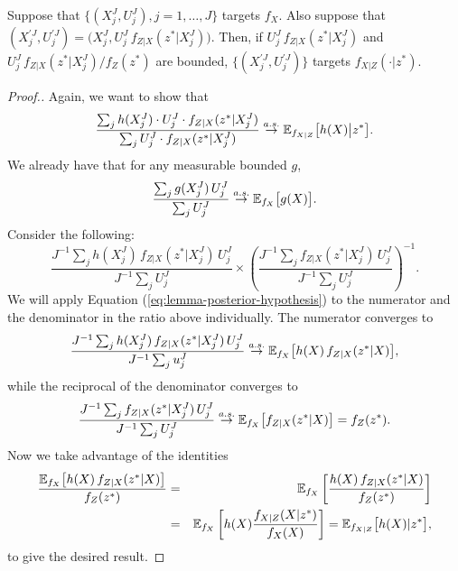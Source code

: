 \begin{lem}
    \label{lem:posterior-proper-weights}
    Suppose that $\{(X_j^J,U_j^J),j=1,\dots,J\}$ targets $f_X$.
    Also suppose that $(X^{\prime J}_j,U^{\prime J}_j) = \big(X_j^J,U_j^J \, f_{Z|X}(z^*|X_j^J)\big)$. 
    Then, if $U_j^J \, f_{Z|X}(z^*|X_j^J)$ and $U_j^J \, f_{Z|X}(z^*|X_j^J) \big/ f_Z(z^*)$ are bounded, $\{(X^{\prime J}_j,U^{\prime J}_j)\}$ targets $f_{X|Z}(\cdot | z^*)$.
\end{lem}

\begin{proof}[Proof.]
    Again, we want to show that
     \begin{equation}
     \frac{\sum_j h(X_j^J) \cdot U_j^J \cdot f_{Z|X}(z^*|X_j^J)}{\sum_j U_j^J \cdot f_{Z|X}(z^*|X_j^J)} \stackrel{a.s.}{\to} \mathbb{E}_{f_{X|Z}}\big[h(X)\big|z^*\big].
     \end{equation}
    We already have that for any measurable bounded $g$,
    \begin{equation}
        \frac{\sum_j g(X_j^J)\, U_j^J}{\sum_j U_j^J} \stackrel{a.s.}{\to} \mathbb{E}_{f_X}\big[g(X)\big].
        \label{eq:lemma-posterior-hypothesis}
    \end{equation}
    Consider the following:
    \begin{equation}
    \frac{J^{-1} \sum_j h(X_j^J) \, f_{Z|X}(z^*|X_j^J)\,  {U}_j^{J}}{J^{-1} \sum_j {U}_j^{J}}
    \times \left( \frac{J^{-1} \sum_j f_{Z|X}(z^*|X_j^J) \, {U}_j^{J}}{J^{-1} \sum_j {U}_j^{J}} \right)^{-1}.
    \end{equation}
    We will apply Equation (\ref{eq:lemma-posterior-hypothesis}) to the numerator and the denominator in the ratio above individually. The numerator converges to 
    \begin{equation}
    \frac{J^{-1} \sum_j h(X_j^J) \, f_{Z|X}(z^*|X_j^J) \, {U}_j^{J}}{J^{-1} \sum_j {u}_j^{J}} \stackrel{a.s.}{\to} \mathbb{E}_{f_X}\big[h(X)\, f_{Z|X}(z^*|X)\big],
    \end{equation}
    while the reciprocal of the denominator converges to 
    \begin{equation} 
    \frac{J^{-1} \sum_j f_{Z|X}(z^*|X_j^J) \, {U}_j^{J}}{J^{-1} \sum_j {U}_j^{J}}  \stackrel{a.s.}{\to} \mathbb{E}_{f_X}\big[f_{Z|X}(z^*|X)\big] = f_Z(z^*).
    \end{equation}
    Now we take advantage of the identities
    \begin{eqnarray}
    \frac{\mathbb{E}_{f_X}\big[h(X)\, f_{Z|X}(z^*|X)\big]}{f_Z(z^*)} &=& \mathbb{E}_{f_X}\left[\frac{h(X)\, f_{Z|X}(z^*|X)}{f_Z(z^*)}\right] 
    \\
    &=& \mathbb{E}_{f_X}\left[h(X)\frac{f_{X|Z}(X|z^*)}{f_X(X)}\right] =  \mathbb{E}_{f_{X|Z}}\big[h(X)|z^*\big],
    \end{eqnarray}
    to give the desired result.
    

\end{proof}
